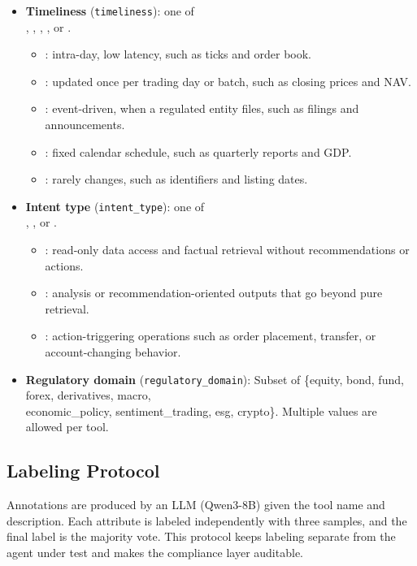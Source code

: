 \begin{itemize}[leftmargin=*]
\item \textbf{Timeliness} (\texttt{timeliness}): one of\\
  \realt, \dailyt, \asfiledt, \periodict, or \statict.
  \begin{itemize}[nosep]
  \item \realt: intra-day, low latency, such as ticks and order book.
  \item \dailyt: updated once per trading day or batch, such as closing prices and NAV.
  \item \asfiledt: event-driven, when a regulated entity files, such as filings and announcements.
  \item \periodict: fixed calendar schedule, such as quarterly reports and GDP.
  \item \statict: rarely changes, such as identifiers and listing dates.
  \end{itemize}
\item \textbf{Intent type} (\texttt{intent\_\allowbreak type}): one of\\
  \informational, \advisory, or \transactional.
  \begin{itemize}[nosep]
  \item \informational: read-only data access and factual retrieval without recommendations or actions.
  \item \advisory: analysis or recommendation-oriented outputs that go beyond pure retrieval.
  \item \transactional: action-triggering operations such as order placement, transfer, or account-changing behavior.
  \end{itemize}
\item \textbf{Regulatory domain} (\texttt{regulatory\_\allowbreak domain}):\newline
  Subset of \{equity, bond, fund, forex, derivatives, macro,\\ economic\_\allowbreak policy, sentiment\_\allowbreak trading, esg, crypto\}. Multiple values are allowed per tool.
\end{itemize}

\subsection{Labeling Protocol}

Annotations are produced by an LLM (Qwen3-8B) given the tool name and description.
Each attribute is labeled independently with three samples, and the final label is the majority vote.
This protocol keeps labeling separate from the agent under test and makes the compliance layer auditable.

